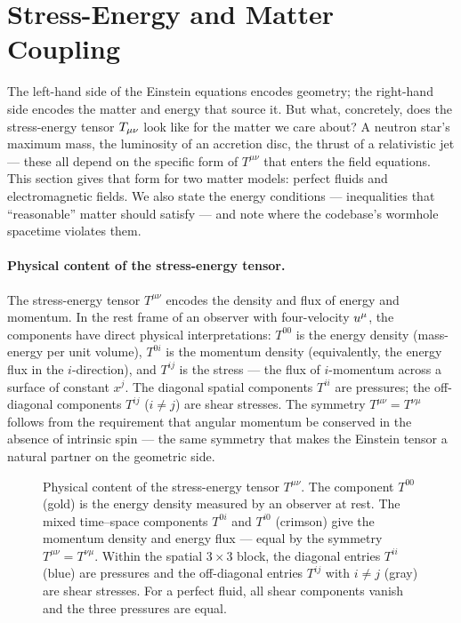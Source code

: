 \section{Stress-Energy and Matter Coupling}
\label{sec:gr-stress-energy}

The left-hand side of the Einstein equations encodes geometry; the
right-hand side encodes the matter and energy that source it.  But what,
concretely, does the stress-energy tensor $T_{\mu\nu}$ look like for
the matter we care about?  A neutron star's maximum mass, the luminosity
of an accretion disc, the thrust of a relativistic jet --- these all
depend on the specific form of $T^{\mu\nu}$ that enters the field
equations.  This section gives that form for two matter models: perfect
fluids and electromagnetic fields.  We also state the energy conditions
--- inequalities that ``reasonable'' matter should satisfy --- and note
where the codebase's wormhole spacetime violates them.

\paragraph{Physical content of the stress-energy tensor.}

The stress-energy tensor $T^{\mu\nu}$ encodes the density and flux of
energy and momentum.  In the rest frame of an observer with four-velocity
$u^{\mu}$, the components have direct physical interpretations: $T^{00}$
is the energy density (mass-energy per unit volume), $T^{0i}$ is the
momentum density (equivalently, the energy flux in the $i$-direction),
and $T^{ij}$ is the stress --- the flux of $i$-momentum across a surface
of constant $x^j$.  The diagonal spatial components $T^{ii}$ are
pressures; the off-diagonal components $T^{ij}$ ($i \neq j$) are shear
stresses.  The symmetry $T^{\mu\nu} = T^{\nu\mu}$ follows from the
requirement that angular momentum be conserved in the absence of
intrinsic spin --- the same symmetry that makes the Einstein tensor a
natural partner on the geometric side.

\begin{figure}[htbp]
  \centering
  
  \caption[Physical content of the stress-energy tensor $T^{\mu\nu}$]{Physical content of the stress-energy tensor $T^{\mu\nu}$.
    The component $T^{00}$ (gold) is the energy density measured by an
    observer at rest.  The mixed time--space components $T^{0i}$ and
    $T^{i0}$ (crimson) give the momentum density and energy flux ---
    equal by the symmetry $T^{\mu\nu} = T^{\nu\mu}$.  Within the spatial
    $3\times 3$ block, the diagonal entries $T^{ii}$ (blue) are pressures
    and the off-diagonal entries $T^{ij}$ with $i \neq j$ (gray) are
    shear stresses.  For a perfect fluid, all shear components vanish and
    the three pressures are equal.}
  \label{fig:stress-energy-components}
\end{figure}

